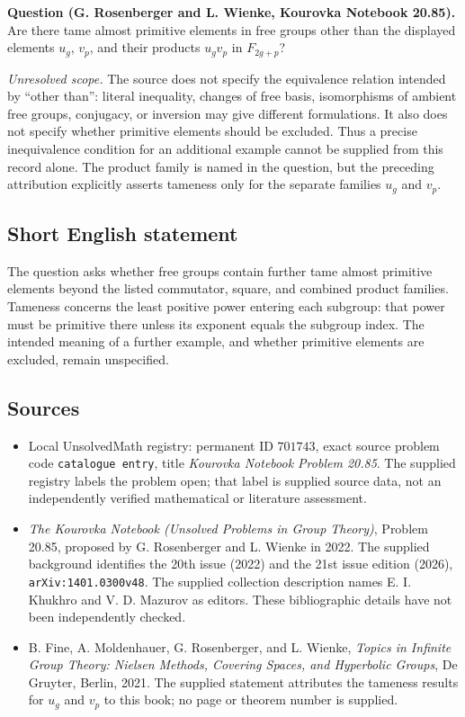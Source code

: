 \documentclass[11pt]{article}
\begin{document}
\textbf{Question (G. Rosenberger and L. Wienke, Kourovka Notebook 20.85).} Are there tame almost primitive elements in free groups other than the displayed elements \(u_g\), \(v_p\), and their products \(u_gv_p\) in \(F_{2g+p}\)?

\emph{Unresolved scope.} The source does not specify the equivalence relation intended by ``other than'': literal inequality, changes of free basis, isomorphisms of ambient free groups, conjugacy, or inversion may give different formulations. It also does not specify whether primitive elements should be excluded. Thus a precise inequivalence condition for an additional example cannot be supplied from this record alone. The product family is named in the question, but the preceding attribution explicitly asserts tameness only for the separate families \(u_g\) and \(v_p\).
\subsection{Short English statement}
The question asks whether free groups contain further tame almost primitive elements beyond the listed commutator, square, and combined product families. Tameness concerns the least positive power entering each subgroup: that power must be primitive there unless its exponent equals the subgroup index. The intended meaning of a further example, and whether primitive elements are excluded, remain unspecified.
\subsection{Sources}
\begin{itemize}
\item Local UnsolvedMath registry: permanent ID \(701743\), exact source problem code \texttt{catalogue entry}, title \emph{Kourovka Notebook Problem 20.85}. The supplied registry labels the problem open; that label is supplied source data, not an independently verified mathematical or literature assessment.
\item \emph{The Kourovka Notebook (Unsolved Problems in Group Theory)}, Problem 20.85, proposed by G. Rosenberger and L. Wienke in 2022. The supplied background identifies the 20th issue (2022) and the 21st issue edition (2026), \texttt{arXiv:1401.0300v48}. The supplied collection description names E. I. Khukhro and V. D. Mazurov as editors. These bibliographic details have not been independently checked.
\item B. Fine, A. Moldenhauer, G. Rosenberger, and L. Wienke, \emph{Topics in Infinite Group Theory: Nielsen Methods, Covering Spaces, and Hyperbolic Groups}, De Gruyter, Berlin, 2021. The supplied statement attributes the tameness results for \(u_g\) and \(v_p\) to this book; no page or theorem number is supplied.
\end{itemize}
\end{document}
